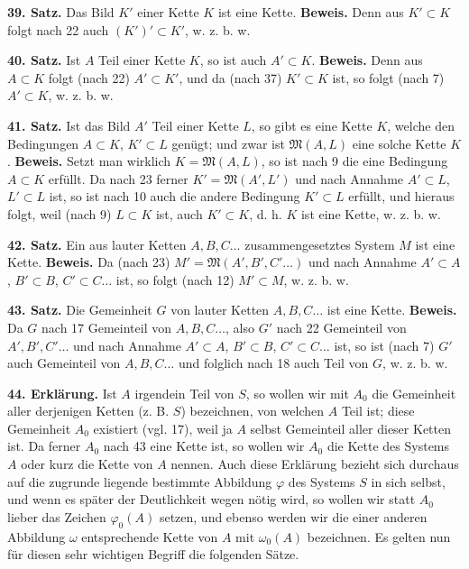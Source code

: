 \documentclass[11pt]{article}
\newcommand{\Mf}{\mathfrak{M}}
\newcommand{\partof}{\mathrel{\subset}}
\begin{document}
\noindent\textbf{39. Satz.} Das Bild $K'$ einer Kette $K$ ist eine Kette. \textbf{Beweis.} Denn aus $K'\partof K$ folgt nach 22 auch $(K')'\partof K'$, w. z. b. w.

\noindent\textbf{40. Satz.} Ist $A$ Teil einer Kette $K$, so ist auch $A'\partof K$. \textbf{Beweis.} Denn aus $A\partof K$ folgt (nach 22) $A'\partof K'$, und da (nach 37) $K'\partof K$ ist, so folgt (nach 7) $A'\partof K$, w. z. b. w.

\noindent\textbf{41. Satz.} Ist das Bild $A'$ Teil einer Kette $L$, so gibt es eine Kette $K$, welche den Bedingungen $A\partof K$, $K'\partof L$ genügt; und zwar ist $\Mf(A,L)$ eine solche Kette $K$. \textbf{Beweis.} Setzt man wirklich $K=\Mf(A,L)$, so ist nach 9 die eine Bedingung $A\partof K$ erfüllt. Da nach 23 ferner $K'=\Mf(A',L')$ und nach Annahme $A'\partof L$, $L'\partof L$ ist, so ist nach 10 auch die andere Bedingung $K'\partof L$ erfüllt, und hieraus folgt, weil (nach 9) $L\partof K$ ist, auch $K'\partof K$, d. h. $K$ ist eine Kette, w. z. b. w.

\noindent\textbf{42. Satz.} Ein aus lauter Ketten $A,B,C\ldots$ zusammengesetztes System $M$ ist eine Kette. \textbf{Beweis.} Da (nach 23) $M'=\Mf(A',B',C'\ldots)$ und nach Annahme $A'\partof A$, $B'\partof B$, $C'\partof C\ldots$ ist, so folgt (nach 12) $M'\partof M$, w. z. b. w.

\noindent\textbf{43. Satz.} Die Gemeinheit $G$ von lauter Ketten $A,B,C\ldots$ ist eine Kette. \textbf{Beweis.} Da $G$ nach 17 Gemeinteil von $A,B,C\ldots$, also $G'$ nach 22 Gemeinteil von $A',B',C'\ldots$ und nach Annahme $A'\partof A$, $B'\partof B$, $C'\partof C\ldots$ ist, so ist (nach 7) $G'$ auch Gemeinteil von $A,B,C\ldots$ und folglich nach 18 auch Teil von $G$, w. z. b. w.

\noindent\textbf{44. Erklärung.} Ist $A$ irgendein Teil von $S$, so wollen wir mit $A_0$ die Gemeinheit aller derjenigen Ketten (z. B. $S$) bezeichnen, von welchen $A$ Teil ist; diese Gemeinheit $A_0$ existiert (vgl. 17), weil ja $A$ selbst Gemeinteil aller dieser Ketten ist. Da ferner $A_0$ nach 43 eine Kette ist, so wollen wir $A_0$ die Kette des Systems $A$ oder kurz die Kette von $A$ nennen. Auch diese Erklärung bezieht sich durchaus auf die zugrunde liegende bestimmte Abbildung $\varphi$ des Systems $S$ in sich selbst, und wenn es später der Deutlichkeit wegen nötig wird, so wollen wir statt $A_0$ lieber das Zeichen $\varphi_0(A)$ setzen, und ebenso werden wir die einer anderen Abbildung $\omega$ entsprechende Kette von $A$ mit $\omega_0(A)$ bezeichnen. Es gelten nun für diesen sehr wichtigen Begriff die folgenden Sätze.
\end{document}
